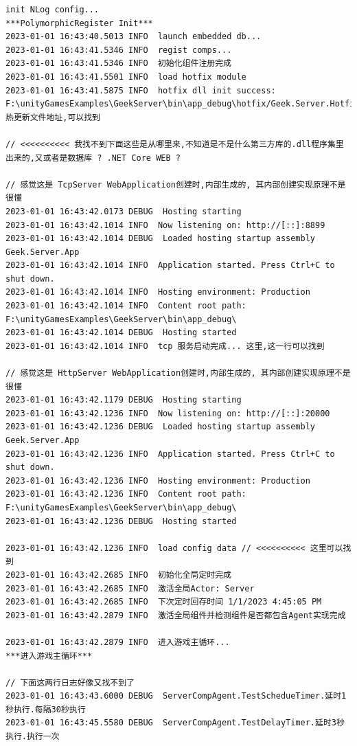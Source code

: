 \documentclass[9pt, b5paper]{article}
\begin{document}
\begin{verbatim}
init NLog config...
***PolymorphicRegister Init***
2023-01-01 16:43:40.5013 INFO  launch embedded db...
2023-01-01 16:43:41.5346 INFO  regist comps...
2023-01-01 16:43:41.5346 INFO  初始化组件注册完成
2023-01-01 16:43:41.5501 INFO  load hotfix module
2023-01-01 16:43:41.5875 INFO  hotfix dll init success: F:\unityGamesExamples\GeekServer\bin\app_debug\hotfix/Geek.Server.Hotfix.dll 热更新文件地址,可以找到

// <<<<<<<<<< 我找不到下面这些是从哪里来,不知道是不是什么第三方库的.dll程序集里出来的,又或者是数据库 ? .NET Core WEB ?

// 感觉这是 TcpServer WebApplication创建时,内部生成的, 其内部创建实现原理不是很懂
2023-01-01 16:43:42.0173 DEBUG  Hosting starting 
2023-01-01 16:43:42.1014 INFO  Now listening on: http://[::]:8899
2023-01-01 16:43:42.1014 DEBUG  Loaded hosting startup assembly Geek.Server.App
2023-01-01 16:43:42.1014 INFO  Application started. Press Ctrl+C to shut down.
2023-01-01 16:43:42.1014 INFO  Hosting environment: Production
2023-01-01 16:43:42.1014 INFO  Content root path: F:\unityGamesExamples\GeekServer\bin\app_debug\
2023-01-01 16:43:42.1014 DEBUG  Hosting started
2023-01-01 16:43:42.1014 INFO  tcp 服务启动完成... 这里,这一行可以找到

// 感觉这是 HttpServer WebApplication创建时,内部生成的, 其内部创建实现原理不是很懂
2023-01-01 16:43:42.1179 DEBUG  Hosting starting
2023-01-01 16:43:42.1236 INFO  Now listening on: http://[::]:20000
2023-01-01 16:43:42.1236 DEBUG  Loaded hosting startup assembly Geek.Server.App
2023-01-01 16:43:42.1236 INFO  Application started. Press Ctrl+C to shut down.
2023-01-01 16:43:42.1236 INFO  Hosting environment: Production
2023-01-01 16:43:42.1236 INFO  Content root path: F:\unityGamesExamples\GeekServer\bin\app_debug\
2023-01-01 16:43:42.1236 DEBUG  Hosting started 

2023-01-01 16:43:42.1236 INFO  load config data // <<<<<<<<<< 这里可以找到
2023-01-01 16:43:42.2685 INFO  初始化全局定时完成
2023-01-01 16:43:42.2685 INFO  激活全局Actor: Server
2023-01-01 16:43:42.2685 INFO  下次定时回存时间 1/1/2023 4:45:05 PM
2023-01-01 16:43:42.2879 INFO  激活全局组件并检测组件是否都包含Agent实现完成

2023-01-01 16:43:42.2879 INFO  进入游戏主循环...
***进入游戏主循环***

// 下面这两行日志好像又找不到了
2023-01-01 16:43:43.6000 DEBUG  ServerCompAgent.TestSchedueTimer.延时1秒执行.每隔30秒执行
2023-01-01 16:43:45.5580 DEBUG  ServerCompAgent.TestDelayTimer.延时3秒执行.执行一次
\end{verbatim}
\end{document}
